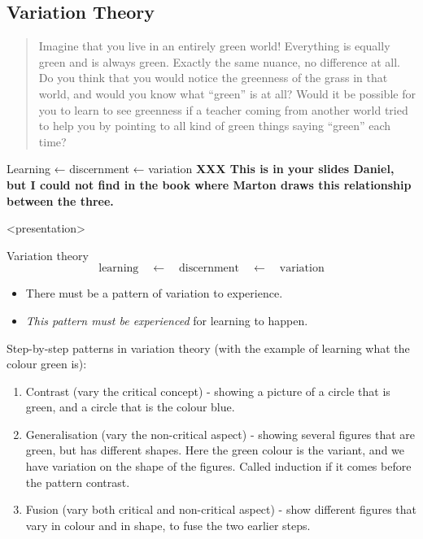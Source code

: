 \subsection{Variation Theory}

\begin{frame}
  \blockcquote[p.~44]{NCOL}{%
    Imagine that you live in an entirely green world!
    Everything is equally green and is always green.
    Exactly the same nuance, no difference at all.
    Do you think that you would notice the greenness of the grass in that 
    world, and would you know what \enquote{green} is at all?
    \textelp{}
    Would it be possible for you to learn to see greenness if a teacher coming 
    from another world tried to help you by pointing to all kind of green 
    things \textelp{} saying \enquote{green} each time?%
  }
\end{frame}

Learning ← discernment ← variation \textbf{XXX This is in your slides 
Daniel, but I could not find in the book where Marton draws this 
relationship between the three.}

\begin{frame}<presentation>
  \begin{block}{Variation theory~\parencite{VariationTheory}}
    \vspace{-0.5em}
    \[
      \text{learning}
      \quad\leftarrow\quad
      \text{discernment}
      \quad\leftarrow\quad
      \text{variation}
    \]
  \end{block}

  \pause

  \begin{remark}
    \begin{itemize}
      \item There must be a pattern of variation to experience.
      \item \emph{This pattern must be experienced} for learning to happen.
    \end{itemize}
  \end{remark}
\end{frame}

Step-by-step patterns in variation theory (with the example of learning 
what the colour green is):

\begin{enumerate}
    \item Contrast (vary the critical concept) - showing a picture of a 
circle that is green, and a circle that is the colour blue.
    \item Generalisation (vary the non-critical aspect) - showing several 
figures that are green, but has different shapes. Here the green colour 
is the variant, and we have variation on the shape of the figures. 
Called induction if it comes before the pattern contrast.
    \item Fusion (vary both critical and non-critical aspect) - show 
different figures that vary in colour and in shape, to fuse the two 
earlier steps.
\end{enumerate}

